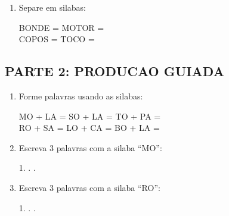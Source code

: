 \begin{exercicio}
\begin{enumerate}
  \item Separe em silabas:
  \begin{center}
  BONDE = \underline{\hspace{1cm}} \underline{\hspace{1cm}} \quad MOTOR = \underline{\hspace{1cm}} \underline{\hspace{1cm}}\\
  COPOS = \underline{\hspace{1cm}} \underline{\hspace{1cm}} \quad TOCO = \underline{\hspace{1cm}} \underline{\hspace{1cm}}
  \end{center}
\end{enumerate}

\subsection*{PARTE 2: PRODUCAO GUIADA}

\begin{enumerate}[resume]
  \item Forme palavras usando as silabas:
  \begin{center}
  MO + LA = \underline{\hspace{2cm}} \quad SO + LA = \underline{\hspace{2cm}} \quad TO + PA = \underline{\hspace{2cm}}\\[0.5em]
  RO + SA = \underline{\hspace{2cm}} \quad LO + CA = \underline{\hspace{2cm}} \quad BO + LA = \underline{\hspace{2cm}}
  \end{center}

  \item Escreva 3 palavras com a silaba ``MO'':
  \begin{center}
  1. \underline{\hspace{3cm}} . \underline{\hspace{3cm}} . \underline{\hspace{3cm}}
  \end{center}

  \item Escreva 3 palavras com a silaba ``RO'':
  \begin{center}
  1. \underline{\hspace{3cm}} . \underline{\hspace{3cm}} . \underline{\hspace{3cm}}
  \end{center}


\end{enumerate}
\end{exercicio}
